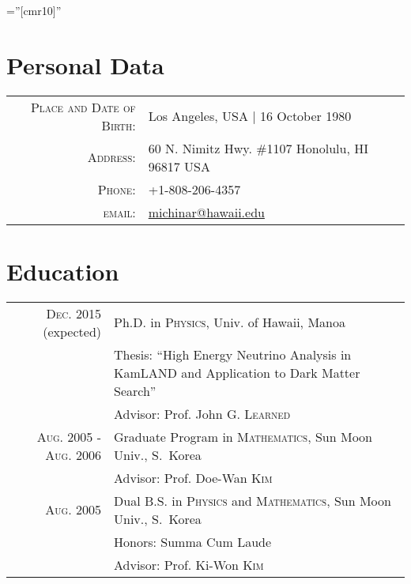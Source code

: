 \documentclass[a4paper,10pt]{article} %
\begin{document}
\pagestyle{empty} %

\font\fb=''[cmr10]'' %


\par{\bigskip\par} %

\section{Personal Data}

\begin{tabular}{rl}
\textsc{Place and Date of Birth:} & Los Angeles, USA  | 16 October 1980\\
\textsc{Address:} & 60 N. Nimitz Hwy. \#1107 Honolulu, HI 96817 USA\\
\textsc{Phone:} & +1-808-206-4357\\
\textsc{email:} & \href{mailto:michinar@hawaii.edu}{michinar@hawaii.edu}
\end{tabular}


\section{Education}

\begin{tabular}{rp{10.3cm}}	
	\textsc{Dec.} 2015 (expected) & Ph.D. in \textsc{Physics},
	Univ. of Hawaii, Manoa\\
	& \small Thesis: ``High Energy Neutrino Analysis in KamLAND and Application
	to Dark Matter Search''\\
	& \small Advisor: Prof. John G. \textsc{Learned}\\


	\textsc{Aug.} 2005 - \textsc{Aug.} 2006 & Graduate Program in
	\textsc{Mathematics}, Sun Moon Univ., S.~Korea\\
	& \small Advisor: Prof. Doe-Wan \textsc{Kim}\\


	\textsc{Aug.} 2005 & Dual B.S. in \textsc{Physics} and
	\textsc{Mathematics}, Sun Moon Univ., S.~Korea\\
	& \small Honors: Summa Cum Laude\\
	& \small Advisor: Prof. Ki-Won \textsc{Kim}\\


\end{tabular}
\end{document}
